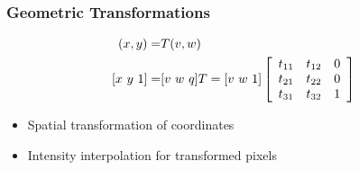 \subsubsection{Geometric Transformations}
\begin{eqnarray}
(x,y) =& T{(v,w)} \notag \\
 \left[ x~y~1 \right] =& [ v~w~q ] T = [ v~w~1 ] 
 \left[ \begin{array}{ccc}
t_{11} & t_{12} & 0 \\
t_{21} & t_{22} & 0 \\
t_{31} & t_{32} & 1 \end{array} \right]
\end{eqnarray}
\begin{itemize}
\item Spatial transformation of coordinates
\item Intensity interpolation for transformed pixels
\end{itemize}
